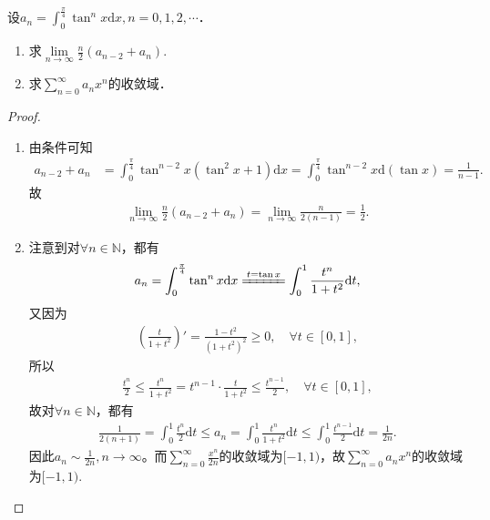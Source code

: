 \documentclass[../../main.tex]{subfiles}
\begin{document}
\begin{example}
设$a_n = \int_0^{\frac{\pi}{4}} \tan^n x \mathrm{d}x, n = 0,1,2,\cdots$．
\begin{enumerate}[(1)]
\item 求$\lim\limits_{n \to \infty} \frac{n}{2}(a_{n-2} + a_n).$

\item 求$\sum\limits_{n=0}^{\infty} a_n x^n$的收敛域．
\end{enumerate}
\end{example}
\begin{proof}
\begin{enumerate}[(1)]
\item 由条件可知
\begin{align*}
a_{n-2} + a_n &= \int_0^{\frac{\pi}{4}} \tan^{n-2}x \left( \tan^2 x + 1 \right) \mathrm{d}x = \int_0^{\frac{\pi}{4}} \tan^{n-2}x \mathrm{d}(\tan x) = \frac{1}{n-1}.
\end{align*}
故
\begin{align*}
\lim_{n \to \infty} \frac{n}{2} \left( a_{n-2} + a_n \right) = \lim_{n \to \infty} \frac{n}{2(n-1)} = \frac{1}{2}.
\end{align*}

\item 注意到对$\forall n\in \mathbb{N}$，都有
\begin{align*}
a_n = \int_0^{\frac{\pi}{4}} \tan^n x \mathrm{d}x \xlongequal{t = \tan x} \int_0^1 \frac{t^n}{1 + t^2} \mathrm{d}t,
\end{align*}
又因为
\begin{align*}
\left( \frac{t}{1 + t^2} \right)' = \frac{1 - t^2}{(1 + t^2)^2} \geqslant 0,\quad \forall t \in [0,1],
\end{align*}
所以
\begin{align*}
\frac{t^n}{2} \leqslant \frac{t^n}{1 + t^2} = t^{n-1} \cdot \frac{t}{1 + t^2} \leqslant \frac{t^{n-1}}{2}, \quad \forall t \in [0,1],
\end{align*}
故对$\forall n\in \mathbb{N}$，都有
\begin{align*}
\frac{1}{2(n+1)} = \int_0^1 \frac{t^n}{2} \mathrm{d}t \leqslant a_n = \int_0^1 \frac{t^n}{1 + t^2} \mathrm{d}t \leqslant \int_0^1 \frac{t^{n-1}}{2} \mathrm{d}t = \frac{1}{2n}.
\end{align*}
因此$a_n \sim \frac{1}{2n}, n \to \infty$。而$\sum\limits_{n=0}^{\infty} \frac{x^n}{2n}$的收敛域为$[-1,1)$，故$\sum\limits_{n=0}^{\infty} a_n x^n$的收敛域为$[-1,1)$.
\end{enumerate}

\end{proof}
\end{document}

